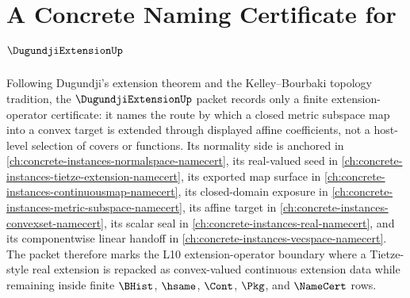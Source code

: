 \chapter{A Concrete Naming Certificate for $\DugundjiExtensionUp$}
\label{ch:concrete-instances-dugundji-extension-namecert}

Following Dugundji's extension theorem and the Kelley--Bourbaki topology tradition, the $\DugundjiExtensionUp$ packet records only a finite extension-operator certificate: it names the route by which a closed metric subspace map into a convex target is extended through displayed affine coefficients, not a host-level selection of covers or functions. Its normality side is anchored in \autoref{ch:concrete-instances-normalspace-namecert}, its real-valued seed in \autoref{ch:concrete-instances-tietze-extension-namecert}, its exported map surface in \autoref{ch:concrete-instances-continuousmap-namecert}, its closed-domain exposure in \autoref{ch:concrete-instances-metric-subspace-namecert}, its affine target in \autoref{ch:concrete-instances-convexset-namecert}, its scalar seal in \autoref{ch:concrete-instances-real-namecert}, and its componentwise linear handoff in \autoref{ch:concrete-instances-vecspace-namecert}. The packet therefore marks the L10 extension-operator boundary where a Tietze-style real extension is repacked as convex-valued continuous extension data while remaining inside finite $\BHist$, $\hsame$, $\Cont$, $\Pkg$, and $\NameCert$ rows.

